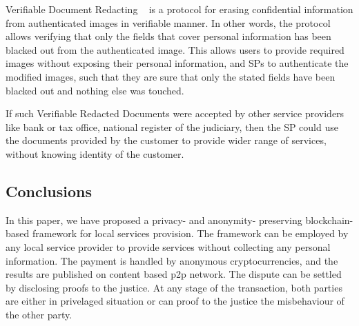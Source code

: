 \documentclass{article}
\begin{document}

Verifiable Document Redacting ~\cite{chabanne2017verifiable} is a protocol for erasing confidential information from authenticated images in verifiable manner. In other words, the protocol allows verifying that only the fields that cover personal information has been blacked out from the authenticated image. This allows users to provide required images without exposing their personal information, and SPs to authenticate the modified images, such that they are sure that only the stated fields have been blacked out and nothing else was touched. 

If such Verifiable Redacted Documents were accepted by other service providers like bank or tax office, national register of the judiciary, then the SP could use the documents provided by the customer to provide wider range of services, without knowing identity of the customer.%


\subsection{Conclusions}
In this paper, we have proposed a privacy- and anonymity- preserving blockchain-based framework for local services provision. The framework can be employed by any local service provider to provide services without collecting any personal information. The payment is handled by anonymous cryptocurrencies, and the results are published on content based p2p network. The dispute can be settled by disclosing proofs to the justice. At any stage of the transaction, both parties are either in privelaged situation or can proof to the justice the misbehaviour of the other party. 




\end{document}
